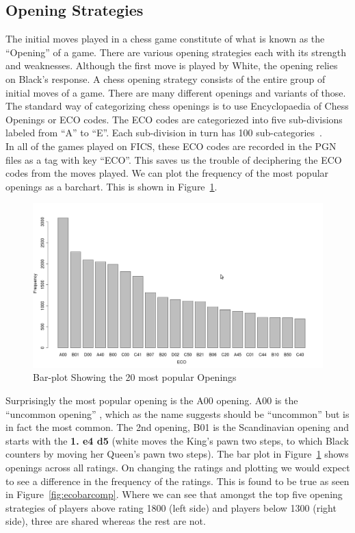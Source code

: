 \documentclass{article}
\begin{document}
\clearpage
\subsection{Opening Strategies}
The initial moves played in a chess game constitute of what is known as the ``Opening'' of a game. There are various opening strategies each with its strength and weaknesses. Although the first move is played by White, the opening relies on Black's response. A chess opening strategy consists of the entire group of initial moves of a game. There are many different openings and variants of those.\\

The standard way of categorizing chess openings is to use Encyclopaedia of Chess Openings or ECO codes. The ECO codes are categoriezed into five sub-divisions labeled from ``A'' to ``E''. Each sub-division in turn has 100 sub-categories~\cite{wiki:eco}.\\

In all of the games played on FICS, these ECO codes are recorded in the PGN files as a tag with key ``ECO''. This saves us the trouble of deciphering the ECO codes from the moves played. We can plot the frequency of the most popular openings as a barchart. This is shown in Figure~\ref{fig:ecobar}.

\begin{figure} [htp]
\begin{center}
\includegraphics[width=5in]{eco_bar.png}
\end{center}
\caption{Bar-plot Showing the 20 most popular Openings}
\label{fig:ecobar}
\end{figure}

Surprisingly the most popular opening is the A00 opening. A00 is the ``uncommon opening'' , which as the name suggests should be ``uncommon'' but is in fact the most common. The 2nd opening, B01 is the Scandinavian opening and starts with the {\bf 1. e4 d5} (white moves the King's pawn two steps, to which Black counters by moving her Queen's pawn two steps). The bar plot in Figure~\ref{fig:ecobar} shows openings across all ratings. On changing the ratings and plotting we would expect to see a difference in the frequency of the ratings. This is found to be true as seen in Figure~\ref{fig:ecobarcomp}. Where we can see that amongst the top five opening strategies of players above rating 1800 (left side) and players below 1300 (right side), three are shared whereas the rest are not.  
\end{document}
